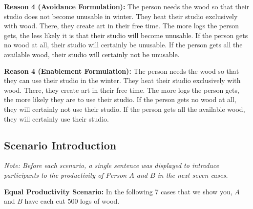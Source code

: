 \documentclass[egregdoesnotlikesansseriftitles]{scrartcl}
\begin{document}
\noindent\textbf{Reason 4 (Avoidance Formulation):} The person needs the wood so that their studio does not become unusable in winter. %
They heat their studio exclusively with wood. %
There, they create art in their free time. %
The more logs the person gets, the less likely it is that their studio will become unusable. %
If the person gets no wood at all, their studio will certainly be unusable. %
If the person gets all the available wood, their studio will certainly not be unusable.\vspace{2ex} %

\noindent\textbf{Reason 4 (Enablement Formulation):} The person needs the wood so that they can use their studio in the winter. %
They heat their studio exclusively with wood. %
There, they create art in their free time. %
The more logs the person gets, the more likely they are to use their studio. %
If the person gets no wood at all, they will certainly not use their studio. %
If the person gets all the available wood, they will certainly use their studio. %


\subsection*{Scenario Introduction}
\noindent\textit{Note: Before each scenario, a single sentence was displayed to introduce participants to the productivity of Person $A$ and $B$ in the next seven cases.}\vspace{2ex}

\noindent\textbf{Equal Productivity Scenario:} In the following 7 cases that we show you, $A$ and $B$ have each cut 500 logs of wood.\vspace{2ex} %
\end{document}
